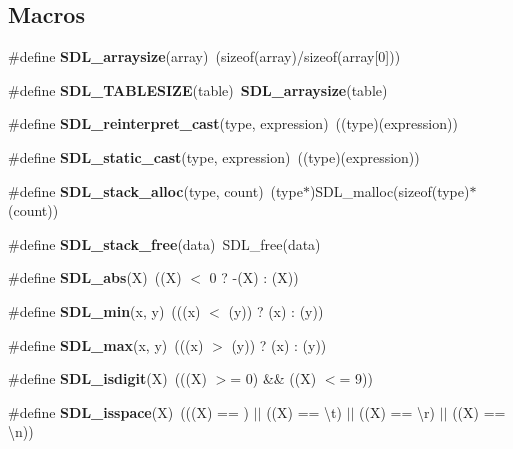 \subsection*{Macros}
\begin{DoxyCompactItemize}
\item 
\#define {\bf S\+D\+L\+\_\+arraysize}(array)~(sizeof(array)/sizeof(array[0]))
\item 
\#define {\bfseries S\+D\+L\+\_\+\+T\+A\+B\+L\+E\+S\+I\+Z\+E}(table)~{\bf S\+D\+L\+\_\+arraysize}(table)\label{_s_d_l__stdinc_8h_ac9d76e3a8ba6474d1714f13ca3c9d7e6}

\item 
\#define {\bfseries S\+D\+L\+\_\+reinterpret\+\_\+cast}(type,  expression)~((type)(expression))\label{_s_d_l__stdinc_8h_a9891f68858953b42cbc18e68a441e39d}

\item 
\#define {\bfseries S\+D\+L\+\_\+static\+\_\+cast}(type,  expression)~((type)(expression))\label{_s_d_l__stdinc_8h_a774ea048cf20bd5f86f31da56d2937ff}

\item 
\#define {\bfseries S\+D\+L\+\_\+stack\+\_\+alloc}(type,  count)~(type$\ast$)S\+D\+L\+\_\+malloc(sizeof(type)$\ast$(count))\label{_s_d_l__stdinc_8h_a6c6778dd1ee11d2edce116271c822fbd}

\item 
\#define {\bfseries S\+D\+L\+\_\+stack\+\_\+free}(data)~S\+D\+L\+\_\+free(data)\label{_s_d_l__stdinc_8h_aca62cdb628b52c2f1f2a3004ddf721ce}

\item 
\#define {\bfseries S\+D\+L\+\_\+abs}(X)~((X) $<$ 0 ? -\/(X) \+: (X))\label{_s_d_l__stdinc_8h_a6ffbc96775d304bab561d191e71874d5}

\item 
\#define {\bfseries S\+D\+L\+\_\+min}(x,  y)~(((x) $<$ (y)) ? (x) \+: (y))\label{_s_d_l__stdinc_8h_ad93f0b2393a3aa89f9ce24ac2642744e}

\item 
\#define {\bfseries S\+D\+L\+\_\+max}(x,  y)~(((x) $>$ (y)) ? (x) \+: (y))\label{_s_d_l__stdinc_8h_ae3ab6e7584a16c7217ca0a4622212b61}

\item 
\#define {\bfseries S\+D\+L\+\_\+isdigit}(X)~(((X) $>$= \textquotesingle{}0\textquotesingle{}) \&\& ((X) $<$= \textquotesingle{}9\textquotesingle{}))\label{_s_d_l__stdinc_8h_a6825ac86a89e741c6a05f1b36ef47db5}

\item 
\#define {\bfseries S\+D\+L\+\_\+isspace}(X)~(((X) == \textquotesingle{} \textquotesingle{}) $\vert$$\vert$ ((X) == \textquotesingle{}\textbackslash{}t\textquotesingle{}) $\vert$$\vert$ ((X) == \textquotesingle{}\textbackslash{}r\textquotesingle{}) $\vert$$\vert$ ((X) == \textquotesingle{}\textbackslash{}n\textquotesingle{}))\label{_s_d_l__stdinc_8h_aea90c573db7b50355f25355fa017a580}


\end{DoxyCompactItemize}
